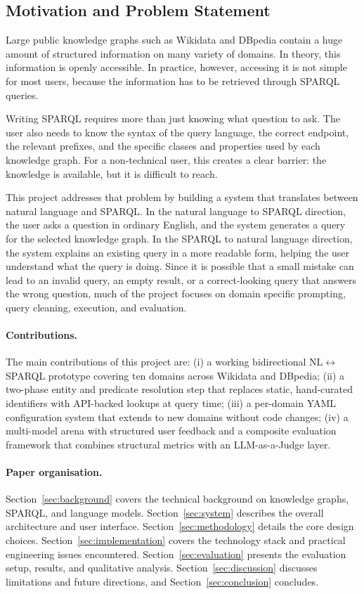 \documentclass[11pt,a4paper]{article}
\begin{document}
\subsection{Motivation and Problem Statement }
\label{sec:motivation}

Large public knowledge graphs such as Wikidata and DBpedia contain a huge amount of structured information on many variety of domains. In theory, this information is openly accessible. In practice, however, accessing it is not simple for most users, because the information has to be retrieved through SPARQL queries.

Writing SPARQL requires more than just knowing what question to ask. The user also needs to know the syntax of the query language, the correct endpoint, the relevant prefixes, and the specific classes and properties used by each knowledge graph. For a non-technical user, this creates a clear barrier: the knowledge is available, but it is difficult to reach.

This project addresses that problem by building a system that translates between natural language and SPARQL. In the natural language to SPARQL direction, the user asks a question in ordinary English, and the system generates a query for the selected knowledge graph. In the SPARQL to natural language direction, the system explains an existing query in a more readable form, helping the user understand what the query is doing. Since it is possible that a small mistake can lead to an invalid query, an empty result, or a correct-looking query that answers the wrong question, much of the project focuses on domain specific prompting, query cleaning, execution, and evaluation.

\paragraph{Contributions.}
The main contributions of this project are: (i) a working bidirectional NL$\leftrightarrow$SPARQL prototype covering ten domains across Wikidata and DBpedia; (ii) a two-phase entity and predicate resolution step that replaces static, hand-curated identifiers with API-backed lookups at query time; (iii) a per-domain YAML configuration system that extends to new domains without code changes; (iv) a multi-model arena with structured user feedback and a composite evaluation framework that combines structural metrics with an LLM-as-a-Judge layer.

\paragraph{Paper organisation.}
Section~\ref{sec:background} covers the technical background on knowledge graphs, SPARQL, and language models. Section~\ref{sec:system} describes the overall architecture and user interface. Section~\ref{sec:methodology} details the core design choices. Section~\ref{sec:implementation} covers the technology stack and practical engineering issues encountered. Section~\ref{sec:evaluation} presents the evaluation setup, results, and qualitative analysis. Section~\ref{sec:discussion} discusses limitations and future directions, and Section~\ref{sec:conclusion} concludes.
\end{document}
